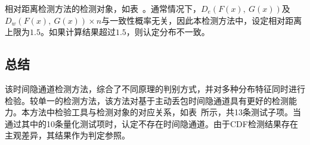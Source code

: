 
相对距离检测方法的检测对象，如表\ 。通常情况下，$D_{e}(F(x),\ G(x))$及$D_{w}(F(x),\ G(x))\times n$与一致性概率无关，因此本检测方法中，设定相对距离上限为$1.5$。如果计算结果超过$1.5$，则认定分布不一致。

\subsection{总结}
\label{chap:analyze:statistical:sum}
该时间隐通道检测方法，综合了不同原理的判别方式，并对多种分布特征同时进行检验。较单一的检测方法，该方法对基于主动丢包时间隐通道具有更好的检测能力。本方法中检验工具与检测对象的对应关系，如表\ 所示，共13条测试子项。当通过其中的10条量化测试项时，认定不存在时间隐通道。由于CDF检测结果存在主观差异，其结果作为判定参照。

